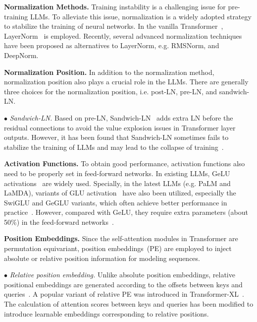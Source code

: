\textbf{Normalization Methods.} {Training instability is a  challenging issue for pre-training  LLMs. To alleviate this issue, normalization is a widely adopted strategy to stabilize the training of neural networks. In the vanilla Transformer~\cite{Vaswani-NIPS-2017-Attention}, LayerNorm~\cite{Jimmy-arxiv-2016-Layer} is employed. Recently, several advanced normalization techniques have been proposed as alternatives to LayerNorm, e.g. RMSNorm, and DeepNorm. }

\textbf{Normalization Position.} {In addition to the normalization method, normalization position also plays a  crucial role in the LLMs. There are generally three choices for the normalization position, i.e. post-LN, pre-LN, and sandwich-LN. } 

    $\bullet$ \emph{Sandwich-LN.} Based on pre-LN, Sandwich-LN~\cite{Ding-NIPS-2021-CogView} adds extra LN before the residual connections to avoid the  {value explosion issues in Transformer layer outputs.} However, it has been found that Sandwich-LN sometimes fails to stabilize the training of LLMs and may lead to the collapse of training~\cite{Zeng-arxiv-2022-GLM}.

\textbf{Activation Functions.} To obtain good performance, activation functions also need to be properly set in feed-forward networks. In existing LLMs, GeLU activations~\cite{Dan-arxiv-2016-Gaussian} are widely used. Specially, in the latest LLMs (e.g. PaLM and LaMDA), variants of GLU activation~\cite{Dauphin-ICML-2017-Language,Shazeer-arxiv-2020-GLU} have also been utilized, especially the SwiGLU and GeGLU variants, which often achieve better performance in practice~\cite{Narang-EMNLP-2021-Do}. However, compared with GeLU, they require extra parameters (about 50\%) in the feed-forward networks~\cite{Le-EMNLP-2022-What}.

\textbf{Position Embeddings.} Since the self-attention modules in Transformer are permutation equivariant, position embeddings~(PE) are employed to inject absolute or relative position information for modeling sequences. 

    $\bullet$ \emph{Relative position embedding.} Unlike absolute position embeddings, relative positional embeddings are generated according to the offsets between keys and queries~\cite{shaw-2018-acl-self}. {A popular variant of relative PE was introduced in Transformer-XL~\cite{dai-2019-acl-transformer,Yang-NeurIPS-2019-xlnet}. The calculation of attention scores between keys and queries has been modified to introduce learnable embeddings corresponding to relative positions.}

